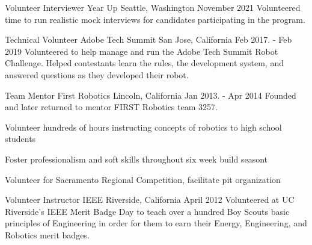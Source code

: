 

\begin{cventries}

  \cventry
    {Volunteer Interviewer} %
    {Year Up} %
    {Seattle, Washington} %
    {November 2021} %
    {Volunteered time to run realistic mock interviews for candidates participating in the program.} %
    {}

  \cventry
    {Technical Volunteer} %
    {Adobe Tech Summit} %
    {San Jose, California} %
    {Feb 2017. - Feb 2019} %
    {Volunteered to help manage and run the Adobe Tech Summit Robot Challenge. Helped contestants learn the rules, the development system, and answered questions as they developed their robot.} %
    {}

  \cventry
    {Team Mentor} %
    {First Robotics} %
    {Lincoln, California} %
    {Jan 2013. - Apr 2014} %
    {Founded and later returned to mentor FIRST Robotics team 3257.}
    {
        \begin{cvitems} %
            \item {Volunteer hundreds of hours instructing concepts of robotics to high school students}
            \item {Foster professionalism and soft skills throughout six week build seasont}
            \item {Volunteer for Sacramento Regional Competition, facilitate pit organization}
        \end{cvitems}
    }

  \cventry
    {Volunteer Instructor} %
    {IEEE} %
    {Riverside, California} %
    {April 2012} %
    {Volunteered at UC Riverside's IEEE Merit Badge Day to teach over a hundred Boy Scouts basic principles of Engineering in order for them to earn their Energy, Engineering, and Robotics merit badges.}
    {}

\end{cventries}
